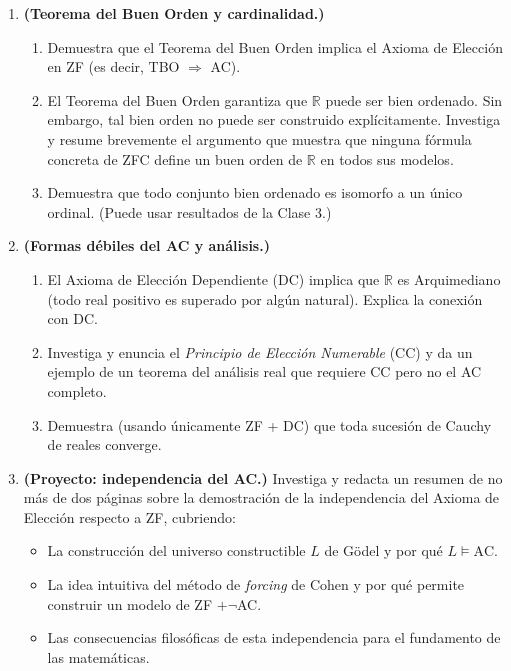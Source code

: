 \begin{enumerate}[leftmargin=2em, label=\textbf{P\arabic*.}, itemsep=0.8em]
  \item \textbf{(Teorema del Buen Orden y cardinalidad.)}
  \begin{enumerate}[label=(\alph*)]
    \item Demuestra que el Teorema del Buen Orden implica el Axioma de Elección en ZF (es decir, TBO $\Rightarrow$ AC).
    \item El Teorema del Buen Orden garantiza que $\mathbb{R}$ puede ser bien ordenado. Sin embargo, tal bien orden no puede ser construido explícitamente. Investiga y resume brevemente el argumento que muestra que ninguna fórmula concreta de ZFC define un buen orden de $\mathbb{R}$ en todos sus modelos.
    \item Demuestra que todo conjunto bien ordenado es isomorfo a un único ordinal. (Puede usar resultados de la Clase 3.)
  \end{enumerate}

  \item \textbf{(Formas débiles del AC y análisis.)}
  \begin{enumerate}[label=(\alph*)]
    \item El Axioma de Elección Dependiente (DC) implica que $\mathbb{R}$ es Arquimediano (todo real positivo es superado por algún natural). Explica la conexión con DC.
    \item Investiga y enuncia el \emph{Principio de Elección Numerable} (CC) y da un ejemplo de un teorema del análisis real que requiere CC pero no el AC completo.
    \item Demuestra (usando únicamente ZF + DC) que toda sucesión de Cauchy de reales converge.
  \end{enumerate}

  \item \textbf{(Proyecto: independencia del AC.)}
  Investiga y redacta un resumen de no más de dos páginas sobre la demostración de la independencia del Axioma de Elección respecto a ZF, cubriendo:
  \begin{itemize}[leftmargin=2em]
    \item La construcción del universo constructible $L$ de Gödel y por qué $L \models \mathrm{AC}$.
    \item La idea intuitiva del método de \emph{forcing} de Cohen y por qué permite construir un modelo de ZF $+ \neg$AC.
    \item Las consecuencias filosóficas de esta independencia para el fundamento de las matemáticas.
  \end{itemize}

\end{enumerate}

